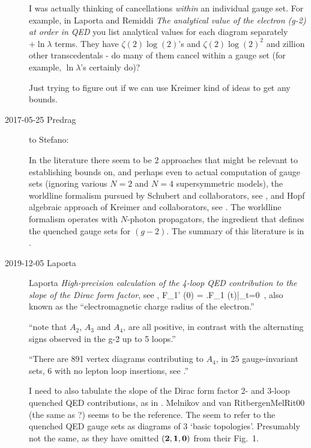 \begin{description}
I was actually thinking of cancellations \emph{within} an individual
gauge set.  For example, in
Laporta and Remiddi
{\em The analytical value of the electron (g-2) at order in QED}
you list analytical values for each diagram separately $+\ln\lambda$
terms. They have $\zeta(2)\log(2)$'s and $\zeta(2)\log(2)^2$ and zillion
other transcedentals - do many of them cancel within a gauge set (for
example, $\ln\lambda$'s certainly do)?

Just trying to figure out if we can use Kreimer kind of ideas to get any
bounds.

\item[2017-05-25 Predrag] to Stefano:

In the literature there seem to be 2 approaches that might be relevant to
establishing bounds on, and perhaps even to actual computation of
gauge sets
(ignoring various $N=2$ and $N=4$ supersymmetric models),
the worldline formalism pursued by Schubert and
collaborators, see ,
and Hopf algebraic approach of Kreimer and
collaborators, see .
The worldline formalism operates with $N$-photon propagators, the ingredient
that defines the quenched gauge sets for $(g-2)$. The summary
of this literature is in .






\item[2019-12-05 Laporta] Laporta {\em High-precision
calculation of the 4-loop {QED} contribution to the slope of the {Dirac}
form factor}, see ,
\beq
F_1' (0) = \left.F_1 (t)\right|_{t=0}
\,,
\label{DiracSlope}
\eeq
also known as the ``electromagnetic charge radius of the electron.''

``note that $A_2$, $A_3$ and $A_4$, are all positive, in contrast with
the alternating signs observed in the g-2 up to 5 loops.''

``There are 891 vertex diagrams contributing to  $A_4$,
in 25 gauge-invariant sets, 6 with no lepton loop insertions, see
.''

I need to also tabulate the slope of the {Dirac} form factor 2- and
3-loop quenched QED contributions, as in . Melnikov
and van Ritbergen{MelRit00} (the same as ?) seems to be
the reference. The seem to refer to the  quenched QED gauge sets as
diagrams of 3 `basic topologies'. Presumably not the same, as they have
omitted $\bf (2,1,0)$ from their Fig.~1.


\end{description}
